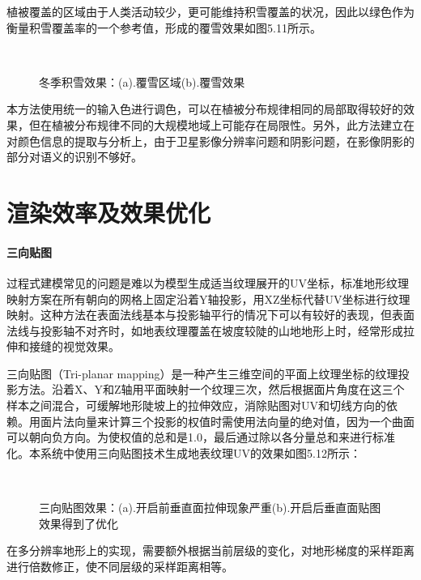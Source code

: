 植被覆盖的区域由于人类活动较少，更可能维持积雪覆盖的状况，因此以绿色作为衡量积雪覆盖率的一个参考值，形成的覆雪效果如图5.11所示。
\begin{figure}[H]
    \centering
     \\
    \caption{冬季积雪效果：(a).覆雪区域(b).覆雪效果}
\end{figure}
本方法使用统一的输入色进行调色，可以在植被分布规律相同的局部取得较好的效果，但在植被分布规律不同的大规模地域上可能存在局限性。另外，此方法建立在对颜色信息的提取与分析上，由于卫星影像分辨率问题和阴影问题，在影像阴影的部分对语义的识别不够好。\par
\section{渲染效率及效果优化}
\paragraph{三向贴图}
过程式建模常见的问题是难以为模型生成适当纹理展开的UV坐标，标准地形纹理映射方案在所有朝向的网格上固定沿着Y轴投影，用XZ坐标代替UV坐标进行纹理映射。这种方法在表面法线基本与投影轴平行的情况下可以有较好的表现，但表面法线与投影轴不对齐时，如地表纹理覆盖在坡度较陡的山地地形上时，经常形成拉伸和接缝的视觉效果。\par
三向贴图（Tri-planar mapping）是一种产生三维空间的平面上纹理坐标的纹理投影方法。沿着X、Y和Z轴用平面映射一个纹理三次，然后根据面片角度在这三个样本之间混合，可缓解地形陡坡上的拉伸效应，消除贴图对UV和切线方向的依赖。用面片法向量来计算三个投影的权值时需使用法向量的绝对值，因为一个曲面可以朝向负方向。为使权值的总和是1.0，最后通过除以各分量总和来进行标准化。本系统中使用三向贴图技术生成地表纹理UV的效果如图5.12所示：\par
\begin{figure}[H]
    \centering
     \\
    \caption{三向贴图效果：(a).开启前垂直面拉伸现象严重(b).开启后垂直面贴图效果得到了优化}
\end{figure}
在多分辨率地形上的实现，需要额外根据当前层级的变化，对地形梯度的采样距离进行倍数修正，使不同层级的采样距离相等。
